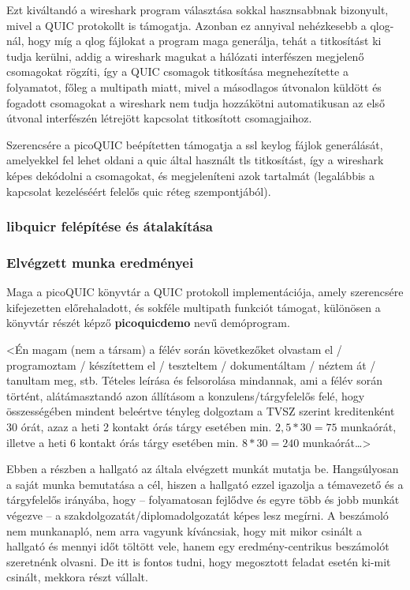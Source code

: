 \documentclass[a4paper,oneside]{article}
\begin{document}
Ezt kiváltandó a wireshark program választása sokkal hasznsabbnak bizonyult, mivel
a QUIC protokollt is támogatja. Azonban ez annyival nehézkesebb a qlog-nál, hogy míg a 
qlog fájlokat a program maga generálja, tehát a titkosítást ki tudja kerülni, addig a wireshark magukat a hálózati interfészen 
megjelenő csomagokat rögzíti, így a QUIC csomagok titkosítása megnehezítette a folyamatot, főleg a multipath miatt, mivel a
másodlagos útvonalon küldött és fogadott csomagokat a wireshark nem tudja hozzákötni automatikusan az első útvonal interfészén létrejött kapcsolat titkosított csomagjaihoz.

Szerencsére a picoQUIC beépítetten támogatja a ssl keylog fájlok generálását, amelyekkel fel lehet oldani a quic által használt tls titkosítást,
így a wireshark képes dekódolni a csomagokat, és megjeleníteni azok tartalmát (legalábbis a kapcsolat kezeléséért felelős quic réteg szempontjából).


\subsubsection{libquicr felépítése és átalakítása}

\subsubsection{Elvégzett munka eredményei}




Maga a picoQUIC könyvtár a QUIC protokoll implementációja, amely szerencsére
kifejezetten előrehaladott, és sokféle multipath funkciót támogat, különösen 
a könyvtár részét képző \textbf{picoquicdemo} nevű demóprogram.



<Én magam (nem a társam) a félév során következőket olvastam el /
programoztam / készítettem el / teszteltem / dokumentáltam / néztem át
/ tanultam meg, stb.  Tételes leírása és felsorolása mindannak, ami a
félév során történt, alátámasztandó azon állításom a
konzulens/tárgyfelelős felé, hogy összességében mindent beleértve
tényleg dolgoztam a TVSZ szerint kreditenként 30 órát, azaz a heti 2
kontakt órás tárgy esetében min. $2,5*30 = 75$ munkaórát, illetve a
heti 6 kontakt órás tárgy esetében min. $8*30 = 240$ munkaórát\dots>

Ebben a részben a hallgató az általa elvégzett munkát mutatja
be. Hangsúlyosan a saját munka bemutatása a cél, hiszen a hallgató
ezzel igazolja a témavezető és a tárgyfelelős irányába, hogy --
folyamatosan fejlődve és egyre több és jobb munkát végezve -- a
szakdolgozatát/diplomadolgozatát képes lesz megírni.  A beszámoló nem
munkanapló, nem arra vagyunk kíváncsiak, hogy mit mikor csinált a
hallgató és mennyi időt töltött vele, hanem egy eredmény-centrikus
beszámolót szeretnénk olvasni.  De itt is fontos tudni, hogy
megosztott feladat esetén ki-mit csinált, mekkora részt vállalt.
\end{document}
